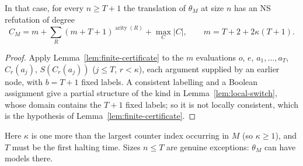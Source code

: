 \begin{corollary}\label{cor:switch-degree}
In that case, for every $n\ge T+1$ the translation of $\theta_M$ at size $n$ has an NS refutation
of degree
\[
 C_M=m+\sum_R(m+T+1)^{\operatorname{arity}(R)}+\max_{C}|C|,\qquad m=T+2+2\kappa(T+1).
\]
\end{corollary}
\begin{proof}
Apply Lemma~\ref{lem:finite-certificate} to the $m$ evaluations $o$, $e$, $a_1,\ldots,a_T$,
$C_r(a_j)$, $S(C_r(a_j))$ ($j\le T$, $r<\kappa$), each argument supplied by an earlier node, with
$b=T+1$ fixed labels. A consistent labelling and a Boolean assignment give a partial structure of
the kind in Lemma~\ref{lem:local-switch}, whose domain contains the $T+1$ fixed labels; so it is not
locally consistent, which is the hypothesis of Lemma~\ref{lem:finite-certificate}.
\end{proof}

Here $\kappa$ is one more than the largest counter index occurring in $M$ (so $\kappa\ge1$), and $T$ must be
the first halting time. Sizes $n\le T$ are genuine exceptions: $\theta_M$ can have models there.

